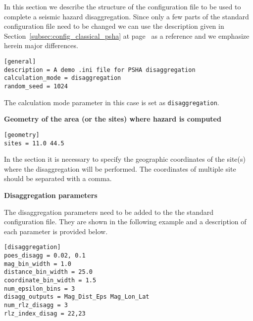 In this section we describe the structure of the configuration file to be used
to complete a seismic hazard disaggregation. Since only a few parts of the
standard configuration file need to be changed we can use the description
given in Section~\ref{subsec:config_classical_psha} at
page~\pageref{subsec:config_classical_psha} as a reference and we emphasize
herein major differences.

\begin{verbatim}
[general]
description = A demo .ini file for PSHA disaggregation
calculation_mode = disaggregation
random_seed = 1024
\end{verbatim}

The calculation mode parameter in this case is set as
\texttt{disaggregation}.

\textbf{Geometry of the area (or the sites) where hazard is computed}

\begin{verbatim}
[geometry]
sites = 11.0 44.5
\end{verbatim}

In the section it is necessary to specify the geographic coordinates of
the site(s) where the disaggregation will be performed. The coordinates
of multiple site should be separated with a comma.

\textbf{Disaggregation parameters}

The disaggregation parameters need to be added to the the standard
configuration file. They are shown in the following example and a description
of each parameter is provided below.

\begin{verbatim}
[disaggregation]
poes_disagg = 0.02, 0.1
mag_bin_width = 1.0
distance_bin_width = 25.0
coordinate_bin_width = 1.5
num_epsilon_bins = 3
disagg_outputs = Mag_Dist_Eps Mag_Lon_Lat
num_rlz_disagg = 3
rlz_index_disag = 22,23
\end{verbatim}

